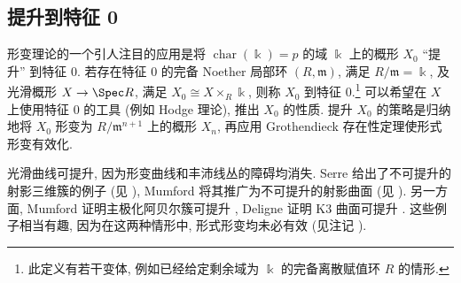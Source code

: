 \subsection{提升到特征 0}\label{src:C.5.3-subsection}
形变理论的一个引人注目的应用是将 $\operatorname{char}(\Bbbk)=p$ 的域 $\Bbbk$ 上的概形 $X_0$ ``提升'' 到特征 $0$. 若存在特征 $0$ 的完备 Noether 局部环 $(R,\mathfrak m)$, 满足 $R/\mathfrak m=\Bbbk$, 及光滑概形 $X\to\Spec R$, 满足 $X_0\cong X\times_R\Bbbk$, 则称 $X_0$ 到特征 $0$.\footnote{此定义有若干变体, 例如已经给定剩余域为 $\Bbbk$ 的完备离散赋值环 $R$ 的情形.} 可以希望在 $X$ 上使用特征 $0$ 的工具 (例如 Hodge 理论), 推出 $X_0$ 的性质. 提升 $X_0$ 的策略是归纳地将 $X_0$ 形变为 $R/\mathfrak m^{n+1}$ 上的概形 $X_n$, 再应用 Grothendieck 存在性定理使形式形变有效化.

光滑曲线可提升, 因为形变曲线和丰沛线丛的障碍均消失. Serre 给出了不可提升的射影三维簇的例子 (见 \cite[定理 $22.4$]{Har10}), Mumford 将其推广为不可提升的射影曲面 (见 \cite[推论 $8.6.7$]{Ill05}). 另一方面, Mumford 证明主极化阿贝尔簇可提升 \cite{Mum69}, Deligne 证明 K3 曲面可提升 \cite{Del81}. 这些例子相当有趣, 因为在这两种情形中, 形式形变均未必有效 (见注记 ).
